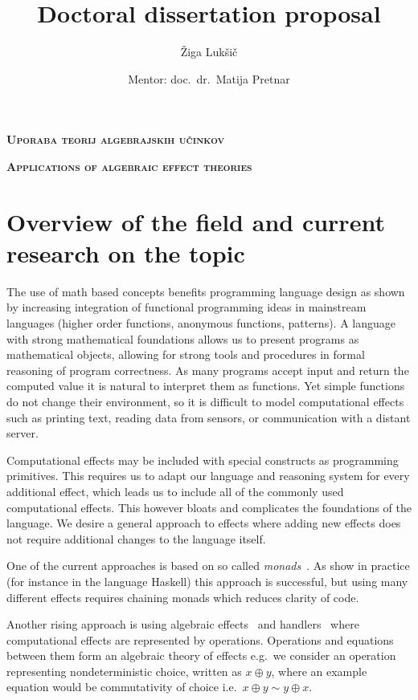\documentclass{article}
\title{Doctoral dissertation proposal}
\author{Žiga Lukšič \and Mentor: doc.\ dr.\ Matija Pretnar}
\date{}
\begin{document}
\maketitle

\vspace{-10mm}
\begin{center}
  \Large{\textsc{\textbf{Uporaba teorij algebrajskih učinkov}}}

  \Large{\textsc{\textbf{Applications of algebraic effect theories}}}
\end{center}

\section*{Overview of the field and current research on the topic}

The use of math based concepts benefits programming language design as shown by increasing integration of functional programming ideas in mainstream languages (higher order functions, anonymous functions, patterns). A language with strong mathematical foundations allows us to present programs as mathematical objects, allowing for strong tools and procedures in formal reasoning of program correctness. As many programs accept input and return the computed value it is natural to interpret them as functions. Yet simple functions do not change their environment, so it is difficult to model computational effects such as printing text, reading data from sensors, or communication with a distant server.

Computational effects may be included with special constructs as programming primitives. This requires us to adapt our language and reasoning system for every additional effect, which leads us to include all of the commonly used computational effects. This however bloats and complicates the foundations of the language. We desire a general approach to effects where adding new effects does not require additional changes to the language itself.

One of the current approaches is based on so called \emph{monads}~\cite{DBLP:journals/iandc/Moggi91}. As show in practice (for instance in the language Haskell) this approach is successful, but using many different effects requires chaining monads which reduces clarity of code.

Another rising approach is using algebraic effects~\cite{DBLP:conf/fossacs/PlotkinP01,DBLP:journals/acs/PlotkinP03} and handlers~\cite{DBLP:conf/esop/PlotkinP09} where computational effects are represented by operations. Operations and equations between them form an algebraic theory of effects e.g.\ we consider an operation representing nondeterministic choice, written as $x \oplus y$, where an example equation would be commutativity of choice i.e.\ $x  \oplus y \sim y \oplus x$.
\end{document}
